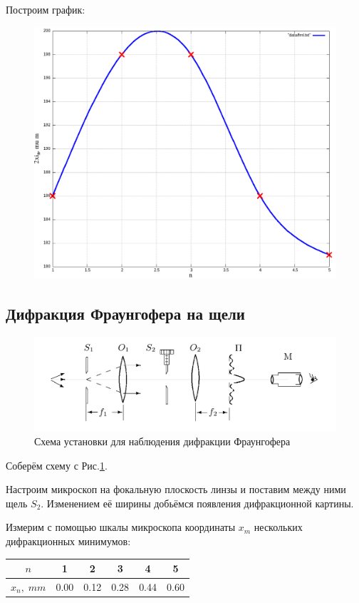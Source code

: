 \documentclass{article}
\begin{document}
Построим график:
\begin{figure}[H]
  \centering
  \includegraphics[width=\textwidth]{frnl.png}
\end{figure}

\subsection{Дифракция Фраунгофера на щели}
\begin{figure}[H]
  \centering
  \includegraphics[width=\textwidth]{fgfr-scheme.png}
  \caption{Схема установки для наблюдения дифракции Фраунгофера}
  \label{fig:fgfr}
\end{figure}

Соберём схему с Рис.\ref{fig:fgfr}.

Настроим микроскоп на фокальную плоскость линзы и поставим между ними щель \(S_2\).
Изменением её ширины добьёмся появления дифракционной картины.

Измерим с помощью шкалы микроскопа координаты \(x_m\) нескольких дифракционных минимумов:

\begin{table}[H]
  \centering
  \begin{tabular}{|c|c|c|c|c|c|}
    \hline
   \(n\)           &  1    & 2     &  3    &  4    &  5    \\\hline
   \(x_n,\;mm\)    & 0.00 & 0.12 & 0.28 & 0.44 & 0.60 \\\hline
  \end{tabular}
\end{table}
\end{document}
